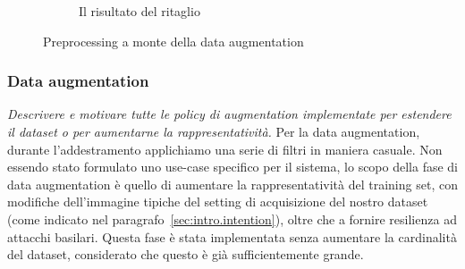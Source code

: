 \begin{figure}[ht]
\begin{subfigure}{0.3\textwidth}
\caption{Il risultato del ritaglio}
\label{sfig:preprocessed}
\end{subfigure}
\caption{Preprocessing a monte della data augmentation}
\label{fig:preprocessing}
\end{figure}

\subsubsection{Data augmentation}
\emph{Descrivere e motivare tutte le policy di augmentation implementate per estendere il dataset o per aumentarne la rappresentatività.}
Per la data augmentation, durante l'addestramento applichiamo una serie di filtri in maniera casuale. Non essendo stato formulato uno use-case specifico per il sistema, lo scopo della fase di data augmentation è quello di aumentare la rappresentatività del training set, con modifiche dell'immagine tipiche del setting di acquisizione del nostro dataset (come indicato nel paragrafo~\ref{sec:intro.intention}), oltre che a fornire resilienza ad attacchi basilari. Questa fase è stata implementata senza aumentare la cardinalità del dataset, considerato che questo è già sufficientemente grande.

